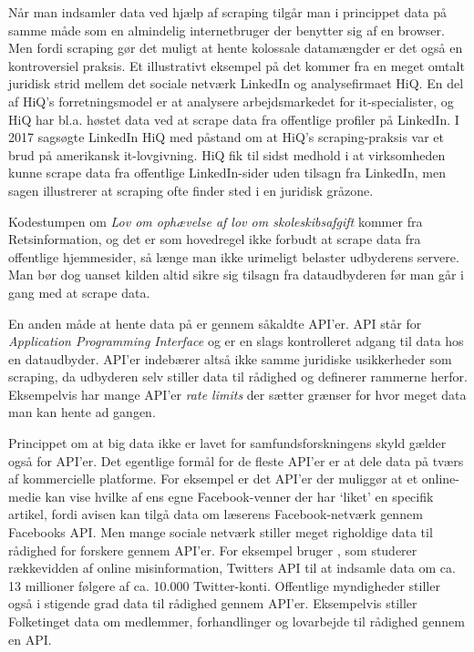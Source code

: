 \documentclass[12pt,]{article}
\begin{document}
Når man indsamler data ved hjælp af scraping tilgår man i princippet
data på samme måde som en almindelig internetbruger der benytter sig af
en browser. Men fordi scraping gør det muligt at hente kolossale
datamængder er det også en kontroversiel praksis. Et illustrativt
eksempel på det kommer fra en meget omtalt juridisk strid mellem det
sociale netværk LinkedIn og analysefirmaet HiQ. En del af HiQ's
forretningsmodel er at analysere arbejdsmarkedet for it-specialister, og
HiQ har bl.a. høstet data ved at scrape data fra offentlige profiler på
LinkedIn. I 2017 sagsøgte LinkedIn HiQ med påstand om at HiQ's
scraping-praksis var et brud på amerikansk it-lovgivning. HiQ fik til
sidst medhold i at virksomheden kunne scrape data fra offentlige
LinkedIn-sider uden tilsagn fra LinkedIn, men sagen illustrerer at
scraping ofte finder sted i en juridisk gråzone.

Kodestumpen om \emph{Lov om ophævelse af lov om skoleskibsafgift} kommer
fra Retsinformation, og det er som hovedregel ikke forbudt at scrape
data fra offentlige hjemmesider, så længe man ikke urimeligt belaster
udbyderens servere. Man bør dog uanset kilden altid sikre sig tilsagn
fra dataudbyderen før man går i gang med at scrape data.

En anden måde at hente data på er gennem såkaldte API'er. API står for
\emph{Application Programming Interface} og er en slags kontrolleret
adgang til data hos en dataudbyder. API'er indebærer altså ikke samme
juridiske usikkerheder som scraping, da udbyderen selv stiller data til
rådighed og definerer rammerne herfor. Eksempelvis har mange API'er
\emph{rate limits} der sætter grænser for hvor meget data man kan hente
ad gangen.

Princippet om at big data ikke er lavet for samfundsforskningens skyld
gælder også for API'er. Det egentlige formål for de fleste API'er er at
dele data på tværs af kommercielle platforme. For eksempel er det API'er
der muliggør at et online-medie kan vise hvilke af ens egne
Facebook-venner der har `liket' en specifik artikel, fordi avisen kan
tilgå data om læserens Facebook-netværk gennem Facebooks API. Men mange
sociale netværk stiller meget righoldige data til rådighed for forskere
gennem API'er. For eksempel bruger \citet{hjorth2019}, som studerer
rækkevidden af online misinformation, Twitters API til at indsamle data
om ca. 13 millioner følgere af ca. 10.000 Twitter-konti. Offentlige
myndigheder stiller også i stigende grad data til rådighed gennem
API'er. Eksempelvis stiller Folketinget data om medlemmer, forhandlinger
og lovarbejde til rådighed gennem en API.
\end{document}
